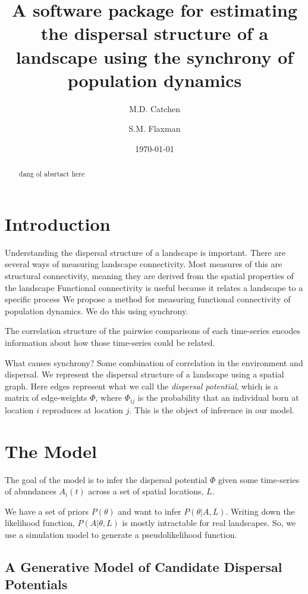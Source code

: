 \documentclass[]{article}
\title{A software package for estimating the dispersal structure of a landscape using the synchrony of population dynamics \\}
\author[1,2]{M.D. Catchen}
\author[1]{S.M. Flaxman}
\affil[1]{\small{Department of Ecology and Evolutionary Biology, University of Colorado at Boulder}}
\affil[2]{\small{Department of Biology, McGill University}}
\date{\today}
\begin{document}
\maketitle
\begin{abstract}

dang ol absrtact here

\end{abstract}
\clearpage
\tableofcontents
\clearpage
\section{Introduction}

Understanding the dispersal structure of a landscape is important.
    There are several ways of measuring landscape connectivity.    
    Most measures of this are structural connectivity, meaning they are derived from the spatial properties of the landscape
    Functional connectivity is useful because it relates a landscape to a specific process
We propose a method for measuring functional connectivity of population dynamics. We do this using synchrony. 

The correlation structure of the pairwise comparisons of each time-series encodes information about how those time-series could be related. 

What causes synchrony? Some combination of correlation in the environment and dispersal. 
We represent the dispersal structure of a landscape using a spatial graph. Here edges represent what we call 
the \textit{dispersal potential}, which is a matrix of edge-weights $\Phi$, where $\Phi_{ij}$ is the probability that an individual born at location $i$ reproduces at location $j$. This is the object of inference in our model. 

\section{The Model}

The goal of the model is to infer the dispersal potential $\Phi$ given some time-series of abundances $A_i(t)$ across a set of spatial locations, $L$.

We have a set of priors $P(\theta)$ and want to infer $P(\theta | A, L)$. Writing down the likelihood function, $P(A | \theta, L)$ is mostly intractable for real landscapes. So, we use a simulation model to generate a pseudolikelihood function. 


\subsection{A Generative Model of Candidate Dispersal Potentials}
\end{document}
